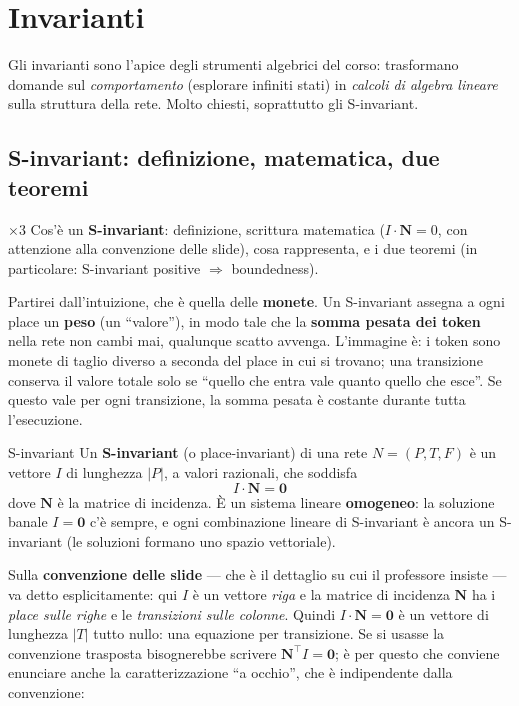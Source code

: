 \chapter{Invarianti}

Gli invarianti sono l'apice degli strumenti algebrici del corso: trasformano domande sul \emph{comportamento} (esplorare infiniti stati) in \emph{calcoli di algebra lineare} sulla struttura della rete. Molto chiesti, soprattutto gli S-invariant.

\section{S-invariant: definizione, matematica, due teoremi}

\begin{domanda}{$\times 3$}
Cos'è un \textbf{S-invariant}: definizione, scrittura matematica ($I \cdot \mathbf{N} = 0$, con attenzione alla convenzione delle slide), cosa rappresenta, e i due teoremi (in particolare: S-invariant positive $\Rightarrow$ boundedness).
\end{domanda}

Partirei dall'intuizione, che è quella delle \textbf{monete}. Un S-invariant assegna a ogni place un \textbf{peso} (un ``valore''), in modo tale che la \textbf{somma pesata dei token} nella rete non cambi mai, qualunque scatto avvenga. L'immagine è: i token sono monete di taglio diverso a seconda del place in cui si trovano; una transizione conserva il valore totale solo se ``quello che entra vale quanto quello che esce''. Se questo vale per ogni transizione, la somma pesata è costante durante tutta l'esecuzione.

\begin{definizione}{S-invariant}
Un \textbf{S-invariant} (o place-invariant) di una rete $N=(P,T,F)$ è un vettore $I$ di lunghezza $|P|$, a valori razionali, che soddisfa
$$I \cdot \mathbf{N} = \mathbf{0}$$
dove $\mathbf{N}$ è la matrice di incidenza. È un sistema lineare \textbf{omogeneo}: la soluzione banale $I=\mathbf{0}$ c'è sempre, e ogni combinazione lineare di S-invariant è ancora un S-invariant (le soluzioni formano uno spazio vettoriale).
\end{definizione}

Sulla \textbf{convenzione delle slide} — che è il dettaglio su cui il professore insiste — va detto esplicitamente: qui $I$ è un vettore \emph{riga} e la matrice di incidenza $\mathbf{N}$ ha i \emph{place sulle righe} e le \emph{transizioni sulle colonne}. Quindi $I \cdot \mathbf{N} = \mathbf{0}$ è un vettore di lunghezza $|T|$ tutto nullo: una equazione per transizione. Se si usasse la convenzione trasposta bisognerebbe scrivere $\mathbf{N}^{\!\top} I = \mathbf{0}$; è per questo che conviene enunciare anche la caratterizzazione ``a occhio'', che è indipendente dalla convenzione:


